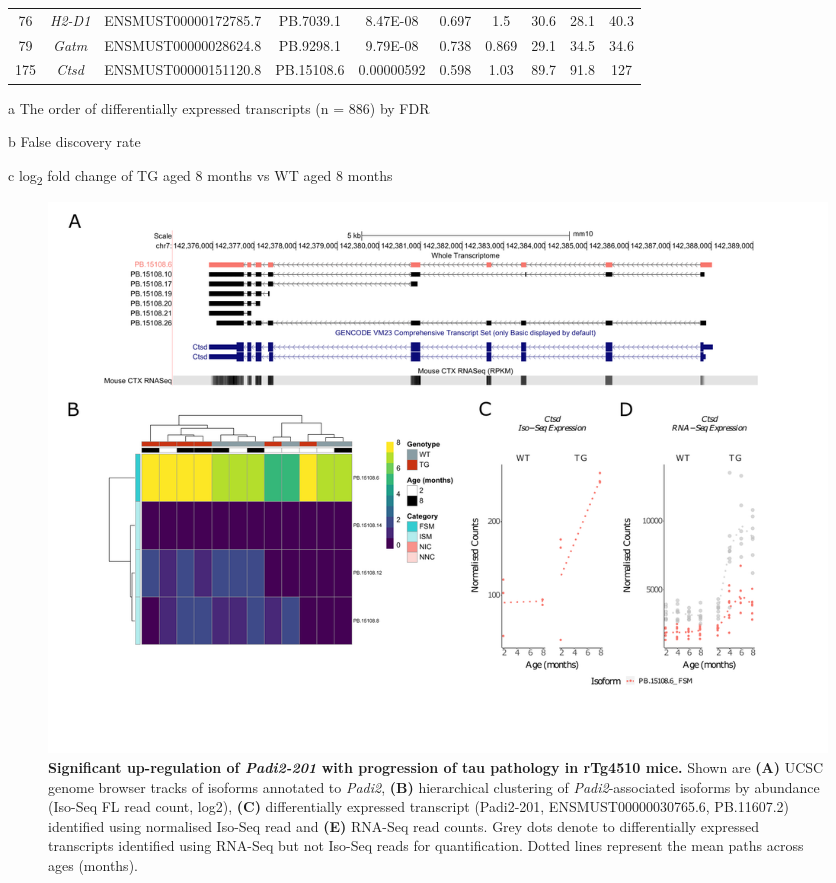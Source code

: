 \begin{landscape}
\begin{table}[]
\begin{threeparttable}
\begin{tabular}{@{}cccccccccc@{}}
		76  & \textit{H2-D1}  & ENSMUST00000172785.7  & PB.7039.1  & 8.47E-08   & 0.697 & 1.5   & 30.6  & 28.1  & 40.3  \\
		79  & \textit{Gatm}   & ENSMUST00000028624.8  & PB.9298.1  & 9.79E-08   & 0.738 & 0.869 & 29.1  & 34.5  & 34.6  \\
		175 & \textit{Ctsd}   & ENSMUST00000151120.8  & PB.15108.6 & 0.00000592 & 0.598 & 1.03  & 89.7  & 91.8  & 127   \\ \bottomrule
	\end{tabular}
	\begin{tablenotes}
		\footnotesize
		\item[a] The order of differentially expressed transcripts (n = 886) by FDR
		\item[b] False discovery rate
		\item[c] log\textsubscript{2} fold change of TG aged 8 months vs WT aged 8 months
	\end{tablenotes}
	\end{threeparttable}
	\label{tab:DEI_trans}
\end{table}
\end{landscape}

\begin{landscape}
	\begin{figure}[!htp]
		\centering
		\includegraphics[page=4,trim={1.5cm 3.5cm 2cm 1cm}, scale = 0.85]{Figures/Ch5_DiffPlots_Landscape.pdf}
		\captionsetup{width=1.5\textwidth}
		\caption[Differential \textit{Padi2} transcript expression]%
		{\textbf{Significant up-regulation of \textit{Padi2-201} with progression of tau pathology in rTg4510 mice.} Shown are \textbf{(A)} UCSC genome browser tracks of isoforms annotated to \textit{Padi2}, \textbf{(B)} hierarchical clustering of \textit{Padi2}-associated isoforms by abundance (Iso-Seq FL read count, log2), \textbf{(C)} differentially expressed transcript (Padi2-201, ENSMUST00000030765.6, PB.11607.2) identified using normalised Iso-Seq read and \textbf{(E)} RNA-Seq read counts. Grey dots denote to differentially expressed transcripts identified using RNA-Seq but not Iso-Seq reads for quantification. Dotted lines represent the mean paths across ages (months).}   
		\label{fig:Padi2}
	\end{figure}	
\end{landscape}

